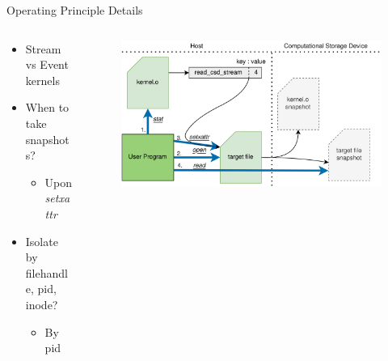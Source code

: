 \documentclass[aspectratio=169, notes]{beamer}
\begin{document}
\begin{frame}{Operating Principle Details}
    \begin{columns}
        \begin{column}{0.40\textwidth}
            \footnotesize
            \begin{itemize}
                \item Stream vs Event kernels
                \item When to take snapshots?
                \begin{itemize}
                    \item Upon \textit{setxattr}
                \end{itemize}
                \item Isolate by filehandle, pid, inode?
                \begin{itemize}
                    \item By pid
                \end{itemize}
            \end{itemize}
            \textit{}
        \end{column}
        \begin{column}{0.60\textwidth}
            \begingroup
            \small
            \begin{figure}
                \centering
                \includegraphics[width=1\textwidth]{resources/images/offloading.png}
            \end{figure}
            \endgroup
        \end{column}
    \end{columns}
\end{frame}
\end{document}
